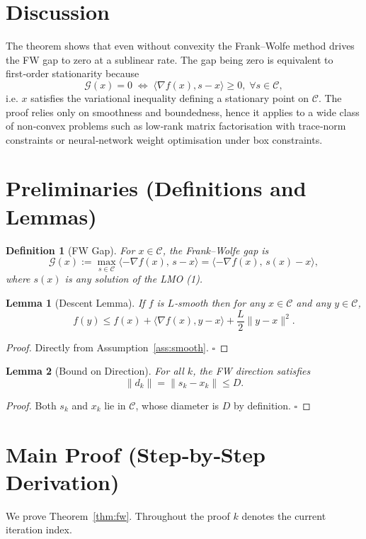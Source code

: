 \documentclass{article}
\newtheorem{lemma}{Lemma}
\newtheorem{definition}{Definition}
\newcommand{\C}{\mathcal{C}}
\begin{document}
\section*{Discussion}
The theorem shows that even without convexity the Frank–Wolfe method drives the FW gap to zero at a sublinear rate. The gap being zero is equivalent to first‑order stationarity because
\[
\mathcal{G}(x)=0\;\Longleftrightarrow\;
\langle\nabla f(x),s-x\rangle\ge0,\;\forall s\in\C,
\]
i.e. $x$ satisfies the variational inequality defining a stationary point on $\C$. The proof relies only on smoothness and boundedness, hence it applies to a wide class of non‑convex problems such as low‑rank matrix factorisation with trace‑norm constraints or neural‑network weight optimisation under box constraints.

\newpage
\section*{Preliminaries (Definitions and Lemmas)}
\begin{definition}[FW Gap]\label{def:gap}
For $x\in\C$, the Frank–Wolfe gap is
\[
\mathcal{G}(x):=\max_{s\in\C}\langle -\nabla f(x),\,s-x\rangle
               =\langle -\nabla f(x),\,s(x)-x\rangle,
\]
where $s(x)$ is any solution of the LMO (1).
\end{definition}

\begin{lemma}[Descent Lemma]\label{lem:descent}
If $f$ is $L$‑smooth then for any $x\in\C$ and any $y\in\C$,
\[
f(y)\le f(x)+\langle\nabla f(x),y-x\rangle+\frac{L}{2}\|y-x\|^{2}.
\tag{7}
\]
\end{lemma}
\begin{proof}
Directly from Assumption~\ref{ass:smooth}. \hfill $\square$
\end{proof}

\begin{lemma}[Bound on Direction]\label{lem:dirbound}
For all $k$, the FW direction satisfies
\[
\|d_{k}\|=\|s_{k}-x_{k}\|\le D.
\tag{8}
\]
\end{lemma}
\begin{proof}
Both $s_{k}$ and $x_{k}$ lie in $\C$, whose diameter is $D$ by definition. \hfill $\square$
\end{proof}

\section*{Main Proof (Step‑by‑Step Derivation)}
We prove Theorem~\ref{thm:fw}. Throughout the proof $k$ denotes the current iteration index.
\end{document}
